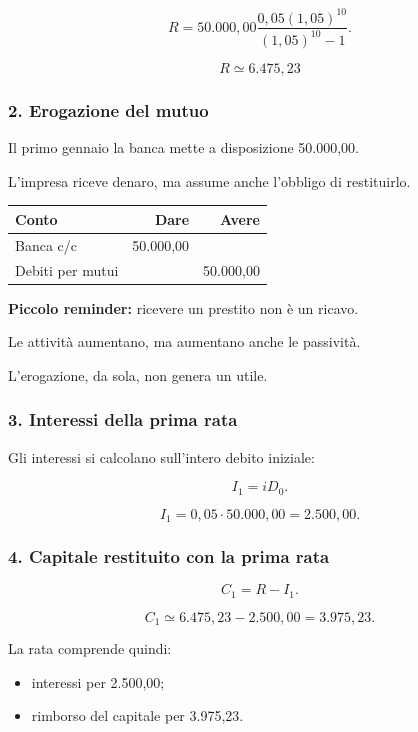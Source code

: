 \[
R=
50.000{,}00
\frac{
0{,}05(1{,}05)^{10}
}{
(1{,}05)^{10}-1
}.
\]

\[
\boxed{
R\simeq6.475{,}23
}
\]


\subsubsection*{2. Erogazione del mutuo}

\noindent Il primo gennaio
la banca mette a disposizione
50.000,00.

\noindent L'impresa riceve denaro,
ma assume anche l'obbligo di restituirlo.

\begin{center}
    \begin{tabular}{|l|r|r|}
        \hline
        \textbf{Conto}
        & \textbf{Dare}
        & \textbf{Avere} \\
        \hline
        Banca c/c
        & 50.000,00 & \\
        Debiti per mutui
        & & 50.000,00 \\
        \hline
    \end{tabular}
\end{center}

\noindent \textbf{Piccolo reminder:}
ricevere un prestito non è un ricavo.

\noindent Le attività aumentano,
ma aumentano anche le passività.

\noindent L'erogazione,
da sola, non genera un utile.


\subsubsection*{3. Interessi della prima rata}

\noindent Gli interessi si calcolano
sull'intero debito iniziale:

\[
I_1=iD_0.
\]

\[
I_1=0{,}05\cdot50.000{,}00
=
\boxed{2.500{,}00}.
\]


\subsubsection*{4. Capitale restituito
con la prima rata}

\[
C_1=R-I_1.
\]

\[
C_1
\simeq
6.475{,}23-2.500{,}00
=
\boxed{3.975{,}23}.
\]

\noindent La rata comprende quindi:

\begin{itemize}
    \item interessi per 2.500,00;
    \item rimborso del capitale
    per 3.975,23.
\end{itemize}


